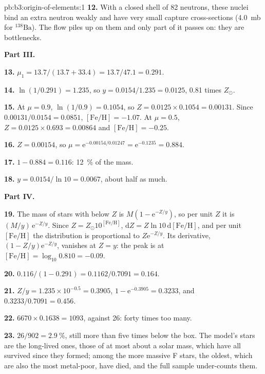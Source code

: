 \begin{solution}{pb:b3:origin-of-elements:1}
\textbf{12.} With a closed shell of 82 neutrons, these nuclei bind an extra
neutron weakly and have very small capture cross-sections (\qty{4.0}{mb}
for $^{138}\mathrm{Ba}$). The flow piles up on them and only part of it
passes on: they are bottlenecks.

\textbf{Part III.}

\textbf{13.} $\mu_1 = 13.7/(13.7 + 33.4) = 13.7/47.1 = \num{0.291}$.

\textbf{14.} $\ln(1/0.291) = \num{1.235}$, so $y = 0.0154/1.235 = \num{0.0125}$,
\num{0.81} times $Z_\odot$.

\textbf{15.} At $\mu = 0.9$, $\ln(1/0.9) = 0.1054$, so $Z = 0.0125\times0.1054 =
\num{0.00131}$. Since $0.00131/0.0154 = 0.0851$, $[\mathrm{Fe/H}] =
-1.07$. At $\mu = 0.5$, $Z = 0.0125\times0.693 = \num{0.00864}$ and
$[\mathrm{Fe/H}] = -0.25$.

\textbf{16.} $Z = 0.00154$, so $\mu = \mathrm{e}^{-0.00154/0.01247} =
\mathrm{e}^{-0.1235} = \num{0.884}$.

\textbf{17.} $1 - 0.884 = \num{0.116}$: \qty{12}{\percent} of the mass.

\textbf{18.} $y = 0.0154/\ln 10 = \num{0.0067}$, about half as much.

\textbf{Part IV.}

\textbf{19.} The mass of stars with  below $Z$ is
$M(1 - \mathrm{e}^{-Z/y})$, so per unit $Z$ it is
$(M/y)\,\mathrm{e}^{-Z/y}$. Since $Z = Z_\odot10^{[\mathrm{Fe/H}]}$,
$\mathrm{d}Z = Z\ln 10\,\mathrm{d}[\mathrm{Fe/H}]$, and per unit
$[\mathrm{Fe/H}]$ the distribution is proportional to
$Z\mathrm{e}^{-Z/y}$. Its derivative,
$(1 - Z/y)\mathrm{e}^{-Z/y}$, vanishes at $Z = y$: the peak is at
$[\mathrm{Fe/H}] = \log_{10}0.810 = -0.09$.

\textbf{20.} $\num{0.116}/(1 - 0.291) = 0.1162/0.7091 = \num{0.164}$.

\textbf{21.} $Z/y = 1.235\times10^{-0.5} = 0.3905$, $1 - \mathrm{e}^{-0.3905} =
0.3233$, and $0.3233/0.7091 = \num{0.456}$.

\textbf{22.} $6670\times0.1638 = 1093$, against 26: forty times too many.

\textbf{23.} $26/902 = \qty{2.9}{\percent}$, still more than five times below
the box. The model's stars are the long-lived ones, those of at most
about a solar mass, which have all survived since they formed; among
the more massive F stars, the oldest, which are also the most
metal-poor, have died, and the full sample under-counts them.


\end{solution}
